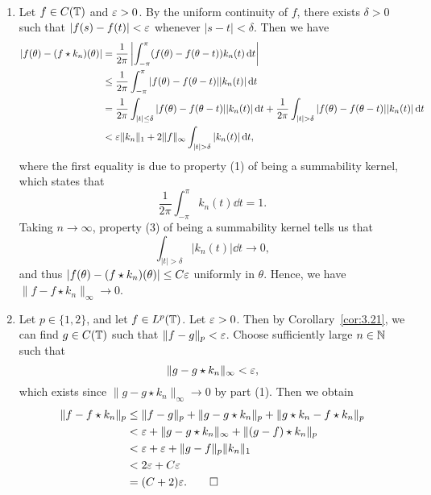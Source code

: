 \begin{pf}~
    \begin{enumerate}[(1)]
        \item Let $f \in C(\mathbb{T})$ and $\varepsilon > 0$. By the uniform continuity of $f$, there exists 
        $\delta > 0$ such that $|f(s) - f(t)| < \varepsilon$ whenever $|s - t| < \delta$. Then we have 
        \begin{align*}
            |f(\theta) - (f \star k_n)(\theta)| 
            &= \frac{1}{2\pi} \left| \int_{-\pi}^\pi (f(\theta) - f(\theta - t)) k_n(t)\dd t \right| \\ 
            &\leq \frac{1}{2\pi} \int_{-\pi}^\pi |f(\theta) - f(\theta - t)| |k_n(t)|\dd t \\ 
            &= \frac{1}{2\pi} \int_{|t|\leq\delta} |f(\theta) - f(\theta - t)||k_n(t)|\dd t 
            + \frac{1}{2\pi} \int_{|t|>\delta} |f(\theta) - f(\theta - t)||k_n(t)|\dd t \\ 
            &< \eps\|k_n\|_1 + 2\|f\|_\infty \int_{|t|>\delta} |k_n(t)|\dd t, 
        \end{align*}
        where the first equality is due to property (1) of being a summability kernel, which 
        states that 
        \[ \frac{1}{2\pi} \int_{-\pi}^\pi k_n(t)\dd t = 1. \] 
        Taking $n \to \infty$, property (3) of being a summability kernel tells us that 
        \[ \int_{|t|>\delta} |k_n(t)|\dd t \to 0, \] 
        and thus $|f(\theta) - (f \star k_n)(\theta)| \leq C\varepsilon$ uniformly in $\theta$. 
        Hence, we have $\|f - f \star k_n\|_\infty \to 0$. 

        \item Let $p \in \{1, 2\}$, and let $f \in L^p(\mathbb{T})$. Let $\varepsilon > 0$. Then by 
        Corollary~\ref{cor:3.21}, we can find $g \in C(\mathbb{T})$ such that $\|f - g\|_p < \varepsilon$. 
        Choose sufficiently large $n \in \mathbb{N}$ such that 
        \[ \|g - g \star k_n\|_\infty < \varepsilon, \] 
        which exists since $\|g - g \star k_n\|_\infty \to 0$ by part (1). Then we obtain 
        \begin{align*}
            \|f - f \star k_n\|_p 
            &\leq \|f - g\|_p + \|g - g \star k_n\|_p + \|g \star k_n - f \star k_n\|_p \\ 
            &< \varepsilon + \|g - g \star k_n\|_\infty + \|(g - f) \star k_n\|_p \\ 
            &< \varepsilon + \varepsilon + \|g - f\|_p \|k_n\|_1 \\ 
            &< 2\varepsilon + C\varepsilon \\ 
            &= (C + 2)\varepsilon. \qedhere 
        \end{align*}
    \end{enumerate}
\end{pf}

